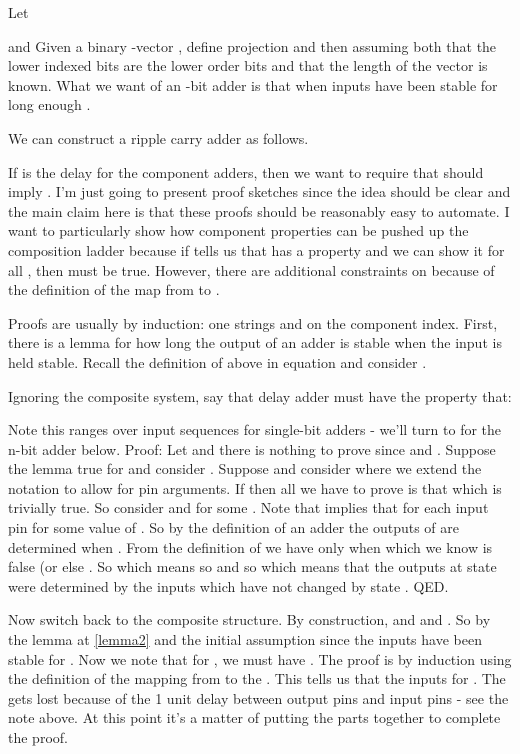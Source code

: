 \documentclass[runningheads,letter]{llncs}
\begin{document}
Let

and 
Given a binary -vector , define projection  and
then  assuming both that the lower indexed bits
are the lower order bits and that the length of the vector is known.
What we want of an -bit adder  is that
when inputs have been stable for long enough .


We can construct a ripple carry adder as follows.



If  is the delay for the component adders, then 
we want to require that  should imply .
I'm just going to present proof sketches since the idea should be clear and
the main claim here is that these proofs should be reasonably easy to 
automate. I want to particularly show how component properties can be pushed
up the composition ladder because if  tells us that  has a 
property  and we can show it for all , then  must be true.
However, there are additional constraints on  because of the definition
of the map from  to .

Proofs are usually by induction: one strings and on the component index.
First, there is a lemma
for how long the output of an adder is stable when the input is held stable.
Recall the definition of  above in equation  and 
consider . 

Ignoring the composite system, say that  delay adder  must have the 
property that:


Note this  ranges over input sequences for single-bit adders - we'll turn to
 for the n-bit adder below.
Proof: Let  and there is nothing to prove since 
and . Suppose the lemma true for  and consider .
Suppose  and
consider  where we extend the  notation to allow for pin arguments.
If  then
all we have to prove is that  which is trivially true. So 
consider  and  for some .
Note that  implies that  for
each input  pin  for some value of .
So by the definition of
an adder the outputs of  are determined when .
From the definition of  we have  only when 
which we know is false (or else .
So  which means 
so  and  so  which means that the
outputs at state  were determined by the inputs which have not changed
by state . QED.

Now switch back to the composite structure.
By construction,   and   and 
 . So by the lemma at \ref{lemma2} and the initial assumption
 since the inputs have been stable for
. Now we note that for , we must have
. The proof is by induction
using the definition of the mapping from  to the .  This tells us that the inputs for . The  gets lost because of the 1 unit delay between output pins and input pins - see the
note above. At this point it's a matter of putting the parts together to complete the proof.
\end{document}
